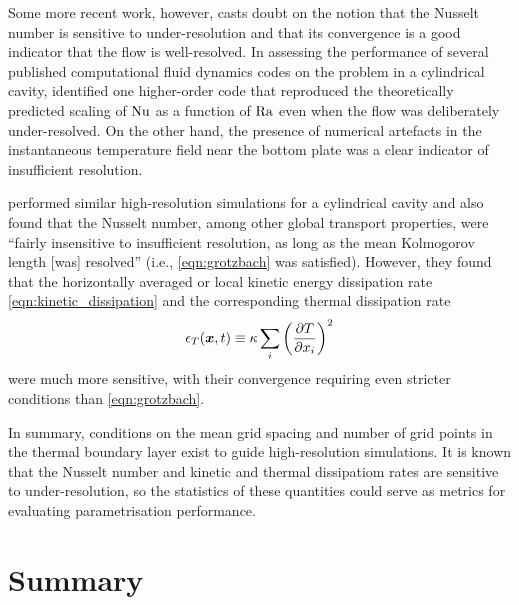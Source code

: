 \documentclass[../main.tex]{subfiles}
\begin{document}
Some more recent work, however, casts doubt on the notion that the Nusselt
number is sensitive to under-resolution and that its convergence is a good
indicator that the flow is well-resolved. In assessing the performance of
several published computational fluid dynamics codes on the \rb{} problem in a
cylindrical cavity, \textcite{kooij2018} identified one higher-order code that
reproduced the theoretically predicted scaling of $\mathrm{Nu}$ as a function of
$\mathrm{Ra}$ even when the flow was deliberately under-resolved. On the other
hand, the presence of numerical artefacts in the instantaneous temperature
field near the bottom plate was a clear indicator of insufficient resolution.


\textcite{scheel2013} performed similar high-resolution simulations for a
cylindrical cavity and also found that the Nusselt number, among other global
transport properties, were ``fairly insensitive to insufficient resolution, as
long as the mean Kolmogorov length [was] resolved'' (i.e., \cref{eqn:grotzbach}
was satisfied). However, they found that the horizontally averaged or local
kinetic energy dissipation rate \cref{eqn:kinetic_dissipation} and the
corresponding thermal dissipation rate
\begin{equation}
    \label{eqn:thermal_dissipation}
    \epsilon_T(\bm{x}, t) \equiv \kappa \sum_i \left(\frac{\partial T}{\partial x_i}\right)^2
\end{equation}
were much more sensitive, with their convergence requiring even stricter
conditions than \cref{eqn:grotzbach}.

In summary, conditions on the mean grid spacing and number of grid points in
the thermal boundary layer exist to guide high-resolution simulations. It is
known that the Nusselt number and kinetic and thermal dissipatiom rates are
sensitive to under-resolution, so the statistics of these quantities could
serve as metrics for evaluating parametrisation performance.


\section{Summary}

\ifSubfilesClassLoaded{%
    \emergencystretch=5em
    \printbibliography{}
}{}
\end{document}
